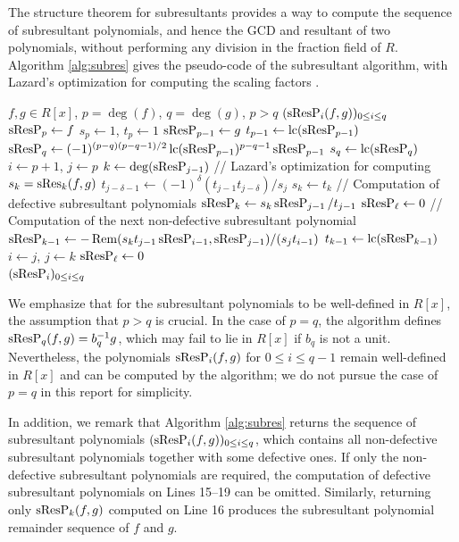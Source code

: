 The structure theorem for subresultants provides a way to compute the sequence of subresultant polynomials, and hence the GCD and resultant of two polynomials, without performing any division in the fraction field of $R$. Algorithm \ref{alg:subres} gives the pseudo-code of the subresultant algorithm, with Lazard's optimization for computing the scaling factors \cite{ducos2000optimizations}.

\begin{algorithm}
    \caption{\textsf{SubresultantPolynomials}}\label{alg:subres}
    \begin{algorithmic}[1]
        \Require $f,g\in R[x]$, $p=\deg(f)$, $q=\deg(g)$, $p>q$
        \Ensure $(\operatorname{sResP}_i(f,g))_{0\leq i\leq q}$
        \State $\operatorname{sResP}_{p} \gets f$
        \State $s_p \gets 1$, $t_p \gets 1$
        \State $\operatorname{sResP}_{p-1} \gets g$
        \State $t_{p-1} \gets \operatorname{lc}(\operatorname{sResP}_{p-1})$
        \State $\operatorname{sResP}_{q} \gets (-1)^{(p-q)(p-q-1)/2} \operatorname{lc}(\operatorname{sResP}_{p-1})^{p-q-1}\operatorname{sResP}_{p-1}$
        \State $s_q \gets \operatorname{lc}(\operatorname{sResP}_{q})$
        \State $i \gets p+1$, $j \gets p$
        \State $k \gets \deg(\operatorname{sResP}_{j-1})$
        \State // Lazard's optimization for computing $s_{k}=\operatorname{sRes}_{k}(f,g)$
        \State $t_{j-\delta-1} \gets (-1)^{\delta}(t_{j-1}t_{j-\delta})/s_j$
        \EndFor
        \State $s_{k} \gets t_{k}$
        \State // Computation of defective subresultant polynomials
        \State $\operatorname{sResP}_{k} \gets s_k \operatorname{sResP}_{j-1}/t_{j-1}$
        \State $\operatorname{sResP}_{\ell} \gets 0$
        \EndFor
        \State // Computation of the next non-defective subresultant polynomial
        \State $\operatorname{sResP}_{k-1} \gets -\operatorname{Rem}(s_{k}t_{j-1}\operatorname{sResP}_{i-1},\operatorname{sResP}_{j-1})/(s_j t_{i-1})$
        \State $t_{k-1} \gets \operatorname{lc}(\operatorname{sResP}_{k-1})$
        \State $i \gets j$, $j \gets k$
        \EndWhile
        \State $\operatorname{sResP}_{\ell} \gets 0$
        \EndFor
        \\
        \Return $(\operatorname{sResP}_i)_{0\leq i\leq q}$
    \end{algorithmic}
\end{algorithm}

We emphasize that for the subresultant polynomials to be well-defined in $R[x]$, the assumption that $p>q$ is crucial. In the case of $p=q$, the algorithm defines $\operatorname{sResP}_{q}(f,g)=b_q^{-1} g$, which may fail to lie in $R[x]$ if $b_q$ is not a unit. Nevertheless, the polynomials $\operatorname{sResP}_i(f,g)$ for $0\leq i\leq q-1$ remain well-defined in $R[x]$ and can be computed by the algorithm; we do not pursue the case of $p=q$ in this report for simplicity.

In addition, we remark that Algorithm \ref{alg:subres} returns the sequence of subresultant polynomials $(\operatorname{sResP}_i(f,g))_{0\leq i\leq q}$, which contains all non-defective subresultant polynomials together with some defective ones. If only the non-defective subresultant polynomials are required, the computation of defective subresultant polynomials on Lines 15–19 can be omitted. Similarly, returning only $\operatorname{sResP}_k(f,g)$ computed on Line 16 produces the subresultant polynomial remainder sequence of $f$ and $g$.

